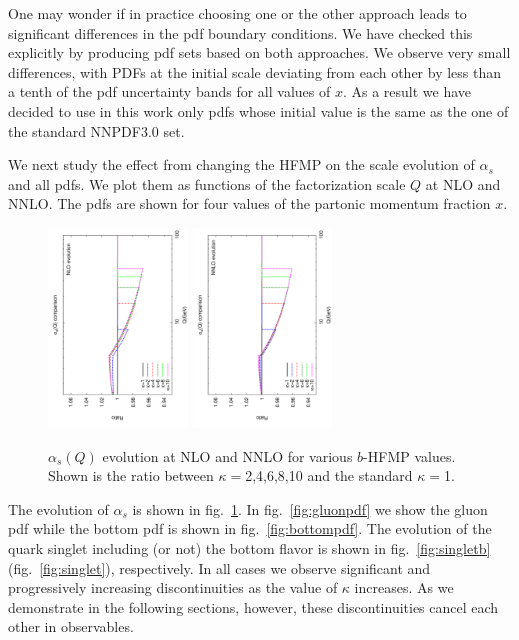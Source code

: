\documentclass[letter,11pt]{article}
\def\as{\alpha_s}
\def\k{\kappa}
\begin{document}
One may wonder if in practice choosing one or the other approach leads to significant differences in the pdf boundary conditions. We have checked this explicitly by producing pdf sets based on both approaches. We observe very small differences, with PDFs at the initial scale deviating from each other by less than a tenth of the pdf uncertainty bands for all values of $x$. As a result we have decided to use in this work only pdfs whose initial value is the same as the one of the standard NNPDF3.0 set.

We next study the effect from changing the HFMP on the scale evolution of $\as$ and all pdfs. We plot them as functions of the factorization scale $Q$ at NLO and NNLO. The pdfs are shown for four values of the partonic momentum fraction $x$.
%
\begin{figure}[t]
\centering
\includegraphics[width=0.33\textwidth,angle=-90]{./alphas_nlo.pdf}
\includegraphics[width=0.33\textwidth,angle=-90]{./alphas_nnlo.pdf}
\caption{$\alpha_s(Q)$ evolution at NLO and NNLO for various $b$-HFMP values. Shown is the ratio between $\k=$2,4,6,8,10 and the standard $\k=$1.}
\label{fig:alphas}
\end{figure}
%

The evolution of $\as$ is shown in fig.~\ref{fig:alphas}. In fig.~\ref{fig:gluonpdf} we show the gluon pdf while the bottom pdf is shown in fig.~\ref{fig:bottompdf}. The evolution of the quark singlet including (or not) the bottom flavor is shown in fig.~\ref{fig:singletb} (fig.~\ref{fig:singlet}), respectively. In all cases we observe significant and progressively increasing discontinuities as the value of $\k$ increases. As we demonstrate in the following sections, however, these discontinuities cancel each other in observables. 
\end{document}

